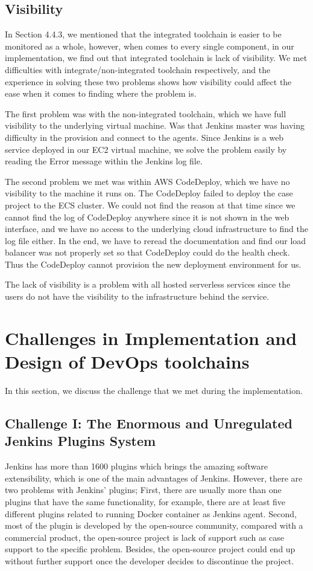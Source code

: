 \subsection{Visibility}
\label{visibility}
In Section 4.4.3, we mentioned that the integrated toolchain is easier to be monitored as a whole, however, when comes to every single component, in our implementation, we find out that integrated toolchain is lack of visibility. We met difficulties with integrate/non-integrated toolchain respectively, and the experience in solving these two problems shows how visibility could affect the ease when it comes to finding where the problem is.
\par
The first problem was with the non-integrated toolchain, which we have full visibility to the underlying virtual machine. Was that Jenkins master was having difficulty in the provision and connect to the agents. Since Jenkins is a web service deployed in our EC2 virtual machine, we solve the problem easily by reading the Error message within the Jenkins log file.
\par
The second problem we met was within AWS CodeDeploy, which we have no visibility to the machine it runs on. The CodeDeploy failed to deploy the case project to the ECS cluster. We could not find the reason at that time since we cannot find the log of CodeDeploy anywhere since it is not shown in the web interface, and we have no access to the underlying cloud infrastructure to find the log file either. In the end, we have to reread the documentation and find our load balancer was not properly set so that CodeDeploy could do the health check. Thus the CodeDeploy cannot provision the new deployment environment for us.
\par
The lack of visibility is a problem with all hosted serverless services since the users do not have the visibility to the infrastructure behind the service.
\section{Challenges in Implementation and Design of DevOps toolchains}
In this section, we discuss the challenge that we met during the implementation. 
\subsection{Challenge I: The Enormous and Unregulated Jenkins Plugins System}
Jenkins has more than 1600 plugins which brings the amazing software extensibility, which is one of the main advantages of Jenkins. However, there are two problems with Jenkins' plugins; First, there are usually more than one plugins that have the same functionality, for example, there are at least five different plugins related to running Docker container as Jenkins agent. Second, most of the plugin is developed by the open-source community, compared with a commercial product, the open-source project is lack of support such as case support to the specific problem. Besides, the open-source project could end up without further support once the developer decides to discontinue the project.

